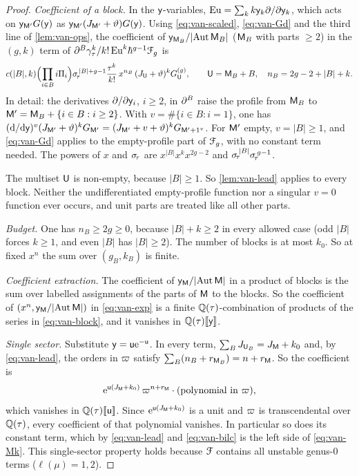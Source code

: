 \begin{proof}
\emph{Coefficient of a block.} In the $\mathsf{y}$-variables, $\mathrm{Eu}=\sum_kk\mathsf{y}_k\partial/\partial\mathsf{y}_k$, which acts on $\mathsf{y}_{\mathsf{M}'}G(\mathsf{y})$ as $\mathsf{y}_{\mathsf{M}'}(J_{\mathsf{M}'}+\vartheta)G(\mathsf{y})$. Using \eqref{eq:van-scaled}, \eqref{eq:van-Gd} and the third line of \cref{lem:van-ops}, the coefficient of $\mathsf{y}_{\mathsf{M}_B}/\lvert\operatorname{Aut}\mathsf{M}_B\rvert$ ($\mathsf{M}_B$ with parts $\geq 2$) in the $(g,k)$ term of $\partial^B\gamma_\tau^k/k!\,\mathrm{Eu}^k\hbar^{g-1}\mathcal{F}_g$ is
\begin{equation}\label{eq:van-block}
c(\lvert B\rvert,k)\Bigl(\prod_{i\in B}i\Pi_i\Bigr)\sigma_{\!\tau}^{\,\lvert B\rvert+g-1}\frac{\tau^k}{k!}\,x^{n_B}\,(J_{\mathsf{U}}+\vartheta)^kG^{(g)}_{\mathsf{U}},\qquad\mathsf{U}=\mathsf{M}_B+B,\quad n_B=2g-2+\lvert B\rvert+k.
\end{equation}
In detail: the derivatives $\partial/\partial\mathsf{y}_i$, $i\geq 2$, in $\partial^B$ raise the profile from $\mathsf{M}_B$ to $\mathsf{M}'=\mathsf{M}_B+\{i\in B:i\geq 2\}$. With $v=\#\{i\in B:i=1\}$, one has $(\mathrm{d}/\mathrm{d}\mathsf{y})^v(J_{\mathsf{M}'}+\vartheta)^kG_{\mathsf{M}'}=(J_{\mathsf{M}'}+v+\vartheta)^kG_{\mathsf{M}'+1^v}$. For $\mathsf{M}'$ empty, $v=\lvert B\rvert\geq 1$, and \eqref{eq:van-Gd} applies to the empty-profile part of $\mathcal{F}_g$, with no constant term needed. The powers of $x$ and $\sigma_{\!\tau}$ are $x^{\lvert B\rvert}x^kx^{2g-2}$ and $\sigma_{\!\tau}^{\,\lvert B\rvert}\sigma_{\!\tau}^{\,g-1}$.

The multiset $\mathsf{U}$ is non-empty, because $\lvert B\rvert\geq 1$. So \cref{lem:van-lead} applies to every block. Neither the undifferentiated empty-profile function nor a singular $v=0$ function ever occurs, and unit parts are treated like all other parts.

\emph{Budget.} One has $n_B\geq 2g\geq 0$, because $\lvert B\rvert+k\geq 2$ in every allowed case (odd $\lvert B\rvert$ forces $k\geq 1$, and even $\lvert B\rvert$ has $\lvert B\rvert\geq 2$). The number of blocks is at most $k_0$. So at fixed $x^n$ the sum over $(g_B,k_B)$ is finite.

\emph{Coefficient extraction.} The coefficient of $\mathsf{y}_{\mathsf{M}}/\lvert\operatorname{Aut}\mathsf{M}\rvert$ in a product of blocks is the sum over labelled assignments of the parts of $\mathsf{M}$ to the blocks. So the coefficient of $(x^n,\mathsf{y}_{\mathsf{M}}/\lvert\operatorname{Aut}\mathsf{M}\rvert)$ in \eqref{eq:van-exp} is a finite $\mathbb{Q}(\tau)$-combination of products of the series in \eqref{eq:van-block}, and it vanishes in $\mathbb{Q}(\tau)[\![ \mathsf{y} ]\!]$.

\emph{Single sector.} Substitute $\mathsf{y}=\mathsf{u}\mathrm{e}^{-\mathsf{u}}$. In every term, $\sum_BJ_{\mathsf{U}_B}=J_{\mathsf{M}}+k_0$ and, by \eqref{eq:van-lead}, the orders in $\varpi$ satisfy $\sum_B(n_B+r_{\mathsf{M}_B})=n+r_{\mathsf{M}}$. So the coefficient is
\[
\mathrm{e}^{\mathsf{u}(J_{\mathsf{M}}+k_0)}\,\varpi^{n+r_{\mathsf{M}}}\cdot(\text{polynomial in }\varpi),
\]
which vanishes in $\mathbb{Q}(\tau)[\![ \mathsf{u} ]\!]$. Since $\mathrm{e}^{\mathsf{u}(J_{\mathsf{M}}+k_0)}$ is a unit and $\varpi$ is transcendental over $\mathbb{Q}(\tau)$, every coefficient of that polynomial vanishes. In particular so does its constant term, which by \eqref{eq:van-lead} and \eqref{eq:van-bilc} is the left side of \eqref{eq:van-Mk}. This single-sector property holds because $\mathcal{F}$ contains all unstable genus-$0$ terms ($\ell(\mu)=1,2$).
\end{proof}

